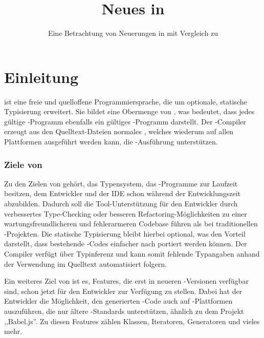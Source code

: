 



\title{Neues in }
\subtitle{Eine Betrachtung von Neuerungen in  mit Vergleich zu }



\maketitle

\begin{abstract}

\end{abstract}

\section{Einleitung}
\ts ist eine freie und quelloffene Programmiersprache, die \js um optionale, statische Typisierung erweitert. Sie bildet eine Obermenge von \js, was bedeutet, dass jedes gültige \js-Programm ebenfalls ein gültiges \ts-Programm darstellt.
Der \ts-Compiler erzeugt aus den Quelltext-Dateien normales \js, welches wiederum auf allen Plattformen ausgeführt werden kann, die \js-Ausführung unterstützen.

\subsubsection*{Ziele von \ts}
Zu den Zielen von \ts gehört, das Typensystem, das \js-Programme zur Laufzeit besitzen, dem Entwickler und der IDE schon während der Entwicklungszeit abzubilden. Dadurch soll die Tool-Unterstützung für den Entwickler durch verbessertes Type-Checking oder besseren Refactoring-Möglichkeiten zu einer wartungsfreundlicheren und fehlerarmeren Codebase führen als bei traditionellen \js-Projekten. Die statische Typisierung bleibt hierbei optional, was den Vorteil darstellt, dass bestehende \js-Codes einfacher nach \ts portiert werden können. Der Compiler verfügt über Typinferenz und kann somit fehlende Typangaben anhand der Verwendung im Quelltext automatisiert folgern.

Ein weiteres Ziel von \ts ist es, Features, die erst in neueren \js-Versionen verfügbar sind, schon jetzt für den Entwickler zur Verfügung zu stellen. Dabei hat der Entwickler die Möglichkeit, den generierten \js-Code auch auf \js-Plattformen auszuführen, die nur ältere \js-Stan\-dards unterstützen, ähnlich zu dem Projekt ,,Babel.js''. Zu diesen Features zählen Klassen, Iteratoren, Generatoren und vieles mehr.

